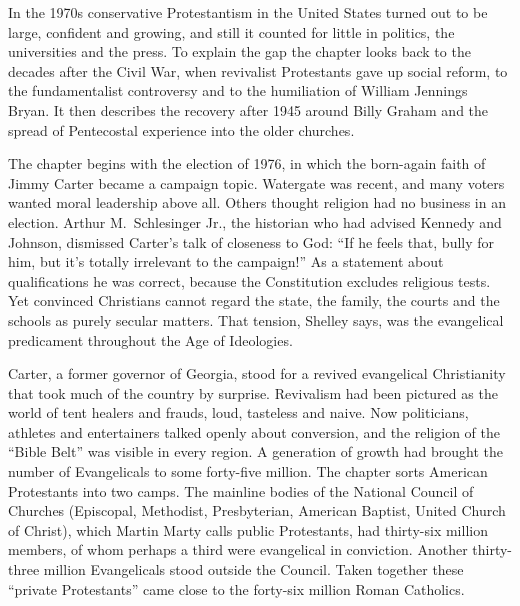 
\begin{inbrief}
In the 1970s conservative Protestantism in the United States turned out to be large, confident and
growing, and still it counted for little in politics, the universities and the press. To explain the
gap the chapter looks back to the decades after the Civil War, when revivalist Protestants gave up
social reform, to the fundamentalist controversy and to the humiliation of William Jennings Bryan. It
then describes the recovery after 1945 around Billy Graham and the spread of Pentecostal experience
into the older churches.
\end{inbrief}

The chapter begins with the election of 1976, in which the born-again faith of Jimmy Carter became a
campaign topic. Watergate was recent, and many voters wanted moral leadership above all. Others
thought religion had no business in an election. Arthur M.~Schlesinger Jr., the historian who had
advised Kennedy and Johnson, dismissed Carter's talk of closeness to God: ``If he feels that, bully
for him, but it's totally irrelevant to the campaign!'' As a statement about qualifications he was
correct, because the Constitution excludes religious tests. Yet convinced Christians cannot regard
the state, the family, the courts and the schools as purely secular matters. That tension, Shelley
says, was the evangelical predicament throughout the Age of Ideologies.

Carter, a former governor of Georgia, stood for a revived evangelical Christianity that took much of
the country by surprise. Revivalism had been pictured as the world of tent healers and frauds, loud,
tasteless and naive. Now politicians, athletes and entertainers talked openly about conversion, and
the religion of the ``Bible Belt'' was visible in every region. A generation of growth had brought
the number of Evangelicals to some forty-five million. The chapter sorts American Protestants into
two camps. The mainline bodies of the National Council of Churches (Episcopal, Methodist,
Presbyterian, American Baptist, United Church of Christ), which Martin Marty calls public
Protestants, had thirty-six million members, of whom perhaps a third were evangelical in conviction.
Another thirty-three million Evangelicals stood outside the Council. Taken together these ``private
Protestants'' came close to the forty-six million Roman Catholics.

